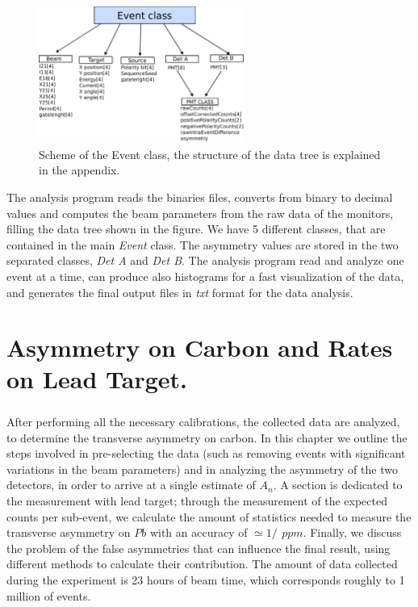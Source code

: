 \begin{figure}[hbtp]
\centering
\includegraphics[width = 0.6\textwidth]{Analysis/EventClass.pdf}
\caption{Scheme of the Event class, the structure of the data tree is explained in the appendix.}
\label{fig:DataTree}
\end{figure}

The analysis program reads the binaries files, converts from binary to decimal values and computes the beam parameters from the raw data of the monitors, filling the data tree shown in the figure. We have 5 different classes, that are contained in the main \textit{Event} class. The asymmetry values are stored in the two separated classes, \textit{Det A} and \textit{Det B}. The analysis program read and analyze one event at a time, can produce also histograms for a fast visualization of the data, and generates the final output files in \textit{txt} format for the data analysis.  

\chapter{Asymmetry on Carbon and Rates on Lead Target.}

\paragraph{}
After performing all the necessary calibrations, the collected data are analyzed, to determine the transverse asymmetry on carbon. In this chapter we outline the steps involved in pre-selecting the data (such as removing events with significant variations in the beam parameters) and in analyzing the asymmetry of the two detectors, in order to arrive at a single estimate of $A_{n}$. A section is dedicated to the measurement with lead target; through the measurement of the expected counts per sub-event, we calculate the amount of statistics needed to measure the transverse asymmetry on $Pb$ with an accuracy of $ \simeq 1/\ \, ppm$. Finally, we discuss the problem of the false asymmetries that can influence the final result, using different methods to calculate their contribution. The amount of data collected during the experiment is 23 hours of beam time, which corresponds roughly to 1 million of events. 
 
